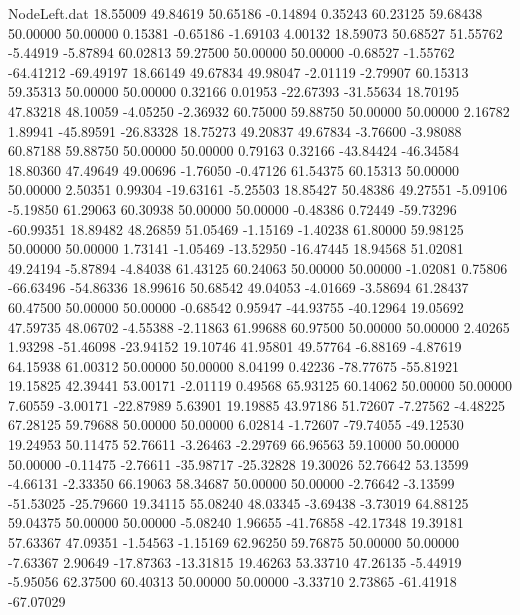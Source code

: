 \begin{filecontents}{NodeLeft.dat}
  18.55009   49.84619   50.65186    -0.14894    0.35243   60.23125   59.68438   50.00000   50.00000    0.15381   -0.65186   -1.69103    4.00132
  18.59073   50.68527   51.55762    -5.44919   -5.87894   60.02813   59.27500   50.00000   50.00000   -0.68527   -1.55762  -64.41212  -69.49197
  18.66149   49.67834   49.98047    -2.01119   -2.79907   60.15313   59.35313   50.00000   50.00000    0.32166    0.01953  -22.67393  -31.55634
  18.70195   47.83218   48.10059    -4.05250   -2.36932   60.75000   59.88750   50.00000   50.00000    2.16782    1.89941  -45.89591  -26.83328
  18.75273   49.20837   49.67834    -3.76600   -3.98088   60.87188   59.88750   50.00000   50.00000    0.79163    0.32166  -43.84424  -46.34584
  18.80360   47.49649   49.00696    -1.76050   -0.47126   61.54375   60.15313   50.00000   50.00000    2.50351    0.99304  -19.63161   -5.25503
  18.85427   50.48386   49.27551    -5.09106   -5.19850   61.29063   60.30938   50.00000   50.00000   -0.48386    0.72449  -59.73296  -60.99351
  18.89482   48.26859   51.05469    -1.15169   -1.40238   61.80000   59.98125   50.00000   50.00000    1.73141   -1.05469  -13.52950  -16.47445
  18.94568   51.02081   49.24194    -5.87894   -4.84038   61.43125   60.24063   50.00000   50.00000   -1.02081    0.75806  -66.63496  -54.86336
  18.99616   50.68542   49.04053    -4.01669   -3.58694   61.28437   60.47500   50.00000   50.00000   -0.68542    0.95947  -44.93755  -40.12964
  19.05692   47.59735   48.06702    -4.55388   -2.11863   61.99688   60.97500   50.00000   50.00000    2.40265    1.93298  -51.46098  -23.94152
  19.10746   41.95801   49.57764    -6.88169   -4.87619   64.15938   61.00312   50.00000   50.00000    8.04199    0.42236  -78.77675  -55.81921
  19.15825   42.39441   53.00171    -2.01119    0.49568   65.93125   60.14062   50.00000   50.00000    7.60559   -3.00171  -22.87989    5.63901
  19.19885   43.97186   51.72607    -7.27562   -4.48225   67.28125   59.79688   50.00000   50.00000    6.02814   -1.72607  -79.74055  -49.12530
  19.24953   50.11475   52.76611    -3.26463   -2.29769   66.96563   59.10000   50.00000   50.00000   -0.11475   -2.76611  -35.98717  -25.32828
  19.30026   52.76642   53.13599    -4.66131   -2.33350   66.19063   58.34687   50.00000   50.00000   -2.76642   -3.13599  -51.53025  -25.79660
  19.34115   55.08240   48.03345    -3.69438   -3.73019   64.88125   59.04375   50.00000   50.00000   -5.08240    1.96655  -41.76858  -42.17348
  19.39181   57.63367   47.09351    -1.54563   -1.15169   62.96250   59.76875   50.00000   50.00000   -7.63367    2.90649  -17.87363  -13.31815
  19.46263   53.33710   47.26135    -5.44919   -5.95056   62.37500   60.40313   50.00000   50.00000   -3.33710    2.73865  -61.41918  -67.07029

\end{filecontents}
